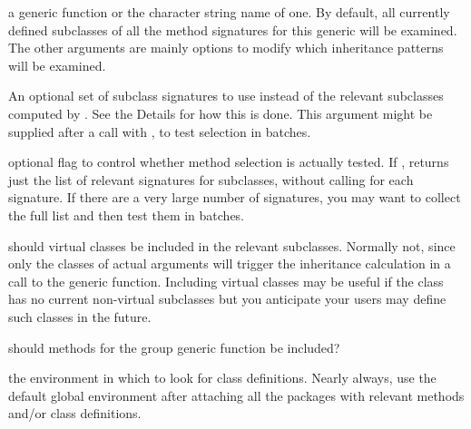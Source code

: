 \begin{Arguments}
\begin{ldescription}
\item[\code{f}] a generic function or the character string name of one.  By default,
all currently defined subclasses of all the method signatures for this
generic will be examined.  The other arguments are mainly options to
modify which inheritance patterns will be examined.

\item[\code{signatures}] 
An optional set of subclass signatures to use instead of the relevant
subclasses computed by .  See the Details
for how this is done.  This argument might be supplied after a call
with , to test selection in batches.

\item[\code{test}] 
optional flag to control whether method selection is actually tested.
If , returns just the list of relevant signatures for
subclasses, without calling  for each signature.
If there are a very large number of signatures, you may want to collect the full list  and then test them in batches.

\item[\code{virtual}] 
should virtual classes be included in the relevant subclasses.
Normally not, since only the classes of actual arguments will trigger
the inheritance calculation in a call to the generic function.
Including virtual classes may be useful if the class has no current
non-virtual subclasses but you anticipate your users may define such
classes in the future.

\item[\code{groupMethods}] 
should methods for the group generic function be included?

\item[\code{where}] 
the environment in which to look for class definitions.  Nearly
always, use the default global environment after attaching all the
packages with relevant methods and/or class definitions.

\end{ldescription}
\end{Arguments}
%
